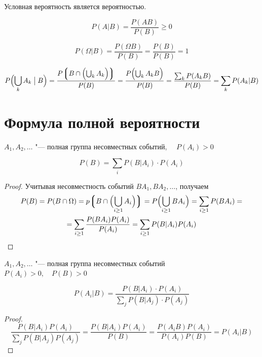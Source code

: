\begin{statement}
	Условная вероятность является вероятностью.
\end{statement}

\begin{eproof}
\item
	$$ P(A|B) = \frac{P(AB)}{P(B)} \ge 0 $$
\item
	$$ P(\Omega|B) = \frac{P(\Omega B)}{P(B)} = \frac{P(B)}{P(B)} = 1 $$
\item
	$$ P \Bigl( \bigcup_k A_k \bigm| B \Bigr) =
	\frac{P \Bigl\lgroup B \cap \Bigl( \bigcup_k A_k \Bigr) \Bigr\rgroup}{P(B)} =
	\frac{P \Bigl( \bigcup_k A_kB \Bigr)}{P(B)} =
	\frac{\sum_k P(A_kB)}{P(B)} = \sum_k P(A_k|B) $$
\end{eproof}

\section{Формула полной вероятности}

\begin{theorem}
	$ A_1, A_2, \dotsc $ "--- полная группа несовместных событий, $ \quad P(A_i) > 0 $

	$$ P(B) = \sum_i P(B|A_i) \cdot P(A_i) $$
\end{theorem}

\begin{proof}
	Учитывая несовместность событий $ BA_1, BA_2, \dotsc $, получаем
	\begin{multline*}
		P(B) = P(B \cap \Omega) =
		p \Bigl\lgroup B \cap \Bigl( \bigcup_{i \ge 1}A_i \Bigr) \Bigr\rgroup =
		P \Bigl( \bigcup_{i \ge 1} BA_i \Bigr) = \sum_{i \ge 1} P(BA_i) = \\
		= \sum_{i \ge 1} \frac{P(BA_i)P(A_i)}{P(A_i)} = \sum_{i \ge 1} P(B|A_i) P(A_i)
	\end{multline*}
\end{proof}

\begin{theorem}
	$ A_1, A_2, \dotsc $ "--- полная группа несовместных событий \\
	$ P(A_i) > 0, \quad P(B) > 0 $

	$$ P(A_i|B) = \frac{P(B|A_i) \cdot P(A_i)}{\sum_j P(B|A_j) \cdot P(A_j)} $$
\end{theorem}

\begin{proof}
	$$ \frac{P(B|A_i)P(A_i)}{\sum_j P(B|A_j)P(A_j)} = \frac{P(B|A_i)P(A_i)}{P(B)} =
	\frac{P(A_iB)P(A_i)}{P(A_i)P(B)} = P(A_i|B) $$
\end{proof}

